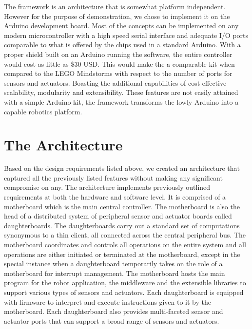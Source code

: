 The \xten framework is an architecture that is somewhat platform independent. However for the purpose of demonstration, we chose to implement it on the Arduino development board. Most of the concepts can be implemented on any modern microcontroller with a high speed serial interface and adequate I/O ports comparable to what is offered by the chips used in a standard Arduino. With a proper shield built on an Arduino running the \xten software, the entire controller would cost as little as \$30 USD. This would make the \xten a comparable kit when compared to the LEGO Mindstorms with respect to the number of ports for sensors and actuators. Boasting the additional capabilities of cost effective scalability, modularity and extensibility.
These features are not easily attained with a simple Arduino kit, the framework transforms the lowly Arduino into a capable robotics platform.




\newpage
\section{The Architecture} %
\label{sec:the_architecture}
Based on the design requirements listed above, we created an architecture that captured all the previously listed features without making any significant compromise on any. The \xten architecture implements previously outlined requirements at both the hardware and software level. It is comprised of a motherboard which is the main central controller. The motherboard is also the head of a distributed system of peripheral sensor and actuator boards called daughterboards. The daughterboards carry out a standard set of computations synonymous to a thin client, all connected across the central peripheral bus. The motherboard coordinates and controls all operations on the entire system and all operations are either initiated or terminated at the motherboard, except in the special instance when a daughterboard temporarily takes on the role of a motherboard for interrupt management. The motherboard hosts the main program for the robot application, the middleware and the extensible libraries to support various types of sensors and actuators. Each daughterboard is equipped with firmware to interpret and execute instructions given to it by the motherboard. Each daughterboard also provides multi-faceted sensor and actuator ports that can support a broad range of sensors and actuators. 

